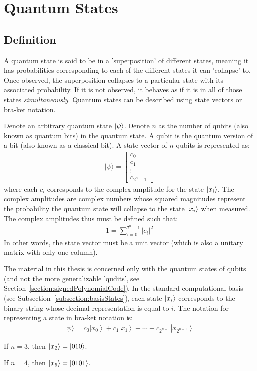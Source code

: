 \section{Quantum States}
\subsection{Definition}
A quantum state is said to be in a 'superposition' of different states, meaning it has probabilities corresponding to each of the different states it can 'collapse' to. Once observed, the superposition collapses to a particular state with its associated probability. If it is not observed, it behaves as if it is in all of those states \emph{simultaneously}. Quantum states can be described using state vectors or bra-ket notation.

Denote an arbitrary quantum state $\ket{\psi}$. Denote $n$ as the number of qubits (also known as quantum bits) in the quantum state. A qubit is the quantum version of a bit (also known as a classical bit). A state vector of $n$ qubits is represented as:
\begin{align}
|\psi\rangle=\left[\begin{array}{c}
c_{0} \\
c_{1} \\
\vdots \\
c_{2^n - 1}
\end{array}\right]
\end{align}
where each $c_i$ corresponds to the complex amplitude for the state $\ket{x_i}$. The complex amplitudes are complex numbers whose squared magnitudes represent the probability the quantum state will collapse to the state $\ket{x_i}$ when measured. The complex amplitudes thus must be defined such that:
\begin{align}
\label{eq:quantumStateConstraint}
1 = \sum_{i=0}^{2^n - 1} \lvert c_i \rvert ^2
\end{align}
In other words, the state vector must be a unit vector (which is also a unitary matrix with only one column).

The material in this thesis is concerned only with the quantum states of qubits (and not the more generalizable 'qudits', see Section~\ref{section:signedPolynomialCode}). In the standard computational basis (see Subsection~\ref{subsection:basisStates}), each state $\ket{x_i}$ corresponds to the binary string whose decimal representation is equal to $i$. The notation for representing a state in bra-ket notation is:
\begin{align}
\label{eq:braketArbitraryStandardBasisState}
|\psi\rangle=c_{0}\left|x_{0}\right\rangle+c_{1}\left|x_{1}\right\rangle+\cdots+c_{2^{n-1}}\left|x_{2^{n-1}}\right\rangle
\end{align}
\begin{example}
If $n=3$, then $\ket{x_2} = \ket{010}$.
\end{example}
\begin{example}
If $n=4$, then $\ket{x_5} = \ket{0101}$.
\end{example}

